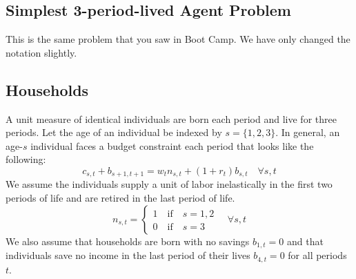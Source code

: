 \documentclass[letterpaper,12pt]{article}
\theoremstyle{definition}
\numberwithin{equation}{section}
\numberwithin{exercise}{section}
\begin{document}
\begin{spacing}{1.5}
\section{Simplest 3-period-lived Agent Problem}\label{Sec3perSimp}

   This is the same problem that you saw in Boot Camp. We have only changed the notation slightly.


   \subsection{Households}\label{Sec3perSimpHH}

      A unit measure of identical individuals are born each period and live for three periods. Let the age of an individual be indexed by $s = \{1,2,3\}$. In general, an age-$s$ individual faces a budget constraint each period that looks like the following:
      \begin{equation}\label{EqHHbc}
         c_{s,t} + b_{s+1,t+1} = w_t n_{s,t} + (1 + r_{t})b_{s,t} \quad\forall s,t
      \end{equation}
      We assume the individuals supply a unit of labor inelastically in the first two periods of life and are retired in the last period of life.
      \begin{equation}\label{EqHHlab}
         n_{s,t} = \begin{cases}
                      1\quad\text{if}\quad s = 1,2 \\
                      0\quad\text{if}\quad s = 3
                   \end{cases} \quad\forall s,t
      \end{equation}
      We also assume that households are born with no savings $b_{1,t} = 0$ and that individuals save no income in the last period of their lives $b_{4,t}=0$ for all periods $t$.


\end{spacing}
\end{document}
